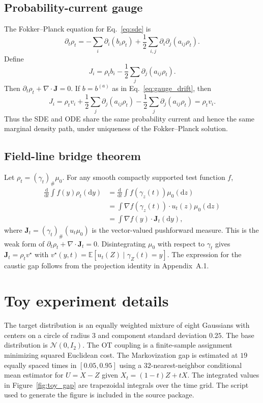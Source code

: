 \documentclass[twoside,11pt]{jmlr}
\numberwithin{equation}{section}
\newcommand{\E}{\mathbb{E}}
\newcommand{\dd}{\mathrm{d}}
\newcommand{\J}{\bm J}
\begin{document}
\subsection{Probability-current gauge}

The Fokker--Planck equation for Eq.~\eqref{eq:sde} is
\begin{equation}
    \partial_t\rho_t
    =-\sum_i\partial_i(b_i\rho_t)
    +\frac12\sum_{i,j}\partial_i\partial_j(a_{ij}\rho_t).
\end{equation}
Define
\begin{equation}
    J_i=\rho_t b_i-\frac12\sum_j\partial_j(a_{ij}\rho_t).
\end{equation}
Then $\partial_t\rho_t+\nabla\cdot \J=0$. If $b=b^{(a)}$ as in Eq.~\eqref{eq:gauge_drift}, then
\begin{equation}
    J_i=\rho_t v_i+\frac12\sum_j\partial_j(a_{ij}\rho_t)-\frac12\sum_j\partial_j(a_{ij}\rho_t)=\rho_t v_i.
\end{equation}
Thus the SDE and ODE share the same probability current and hence the same marginal density path, under uniqueness of the Fokker--Planck solution.

\subsection{Field-line bridge theorem}

Let $\rho_t=(\gamma_t)_\#\mu_0$. For any smooth compactly supported test function $f$,
\begin{align}
    \frac{\dd}{\dd t}\int f(y)\rho_t(\dd y)
    &=\frac{\dd}{\dd t}\int f(\gamma_z(t))\mu_0(\dd z)\\
    &=\int \nabla f(\gamma_z(t))\cdot u_t(z)\mu_0(\dd z)\\
    &=\int \nabla f(y)\cdot \J_t(\dd y),
\end{align}
where $\J_t=(\gamma_t)_\#(u_t\mu_0)$ is the vector-valued pushforward measure. This is the weak form of $\partial_t\rho_t+\nabla\cdot \J_t=0$. Disintegrating $\mu_0$ with respect to $\gamma_t$ gives $\J_t=\rho_t v^\star$ with $v^\star(y,t)=\E[u_t(Z)\mid \gamma_Z(t)=y]$. The expression for the caustic gap follows from the projection identity in Appendix~A.1.

\section{Toy experiment details}

The target distribution is an equally weighted mixture of eight Gaussians with centers on a circle of radius $3$ and component standard deviation $0.25$. The base distribution is $\mathcal N(0,I_2)$. The OT coupling is a finite-sample assignment minimizing squared Euclidean cost. The Markovization gap is estimated at $19$ equally spaced times in $[0.05,0.95]$ using a $32$-nearest-neighbor conditional mean estimator for $U=X-Z$ given $X_t=(1-t)Z+tX$. The integrated values in Figure~\ref{fig:toy_gap} are trapezoidal integrals over the time grid. The script used to generate the figure is included in the source package.


\end{document}
